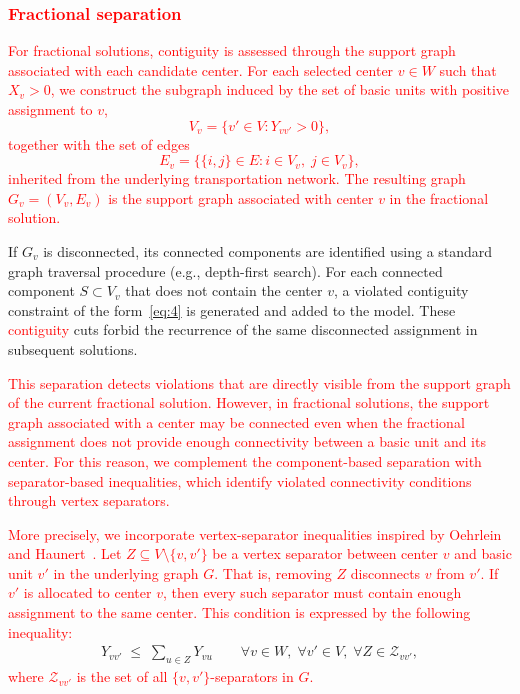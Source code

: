 \documentclass[preprint,11pt]{elsarticle}
\begin{document}
\subsubsection{\textcolor{red}{Fractional separation}}
\label{subsubsec:fractional_separation}

\textcolor{red}{For fractional solutions, contiguity is assessed through the support graph associated with each candidate center.}
\textcolor{red}{For each selected center $v \in W$ such that $X_v > 0$, we construct the subgraph induced by the set of basic units with positive assignment to $v$,
\begin{equation*}
V_v = \{ v' \in V : Y_{vv'} > 0 \},
\end{equation*}
together with the set of edges
\begin{equation*}
E_v = \{ \{i,j\} \in E : i \in V_v,\; j \in V_v \},
\end{equation*}
inherited from the underlying transportation network.
The resulting graph $G_v = (V_v, E_v)$ is the support graph associated with center $v$ in the fractional solution.
}

If $G_v$ is disconnected, its connected components are identified using a standard graph traversal procedure (e.g., depth-first search).
For each connected component $S \subset V_v$ that does not contain the center $v$, a violated contiguity constraint of the form~\eqref{eq:4} is generated and added to the model.
These \textcolor{red}{contiguity} cuts forbid the recurrence of the same disconnected assignment in subsequent solutions.

\textcolor{red}{This separation detects violations that are directly visible from the support graph of the current fractional solution. 
However, in fractional solutions, the support graph associated with a center may be connected even when the fractional assignment does not provide enough connectivity between a basic unit and its center. 
For this reason, we complement the component-based separation with separator-based inequalities, which identify violated connectivity conditions through vertex separators.}

\textcolor{red}{More precisely, we incorporate vertex-separator inequalities inspired by Oehrlein and Haunert~\citep{Oehrlein2017}. 
Let $Z \subseteq V \setminus \{v,v'\}$ be a vertex separator between center $v$ and basic unit $v'$ in the underlying graph $G$. 
That is, removing $Z$ disconnects $v$ from $v'$.
If $v'$ is allocated to center $v$, then every such separator must contain enough assignment to the same center. 
This condition is expressed by the following inequality:}
\begin{align}
Y_{vv'} \;\le\; \sum_{u \in Z} Y_{vu}
\qquad \forall v \in W,\; \forall v' \in V,\; \forall Z \in \mathcal{Z}_{vv'} ,
\label{eq:separator_strength}
\end{align}
\textcolor{red}{
where $\mathcal{Z}_{vv'}$ is the set of all $\{v, v'\}$-separators in $G$.
}
\end{document}
